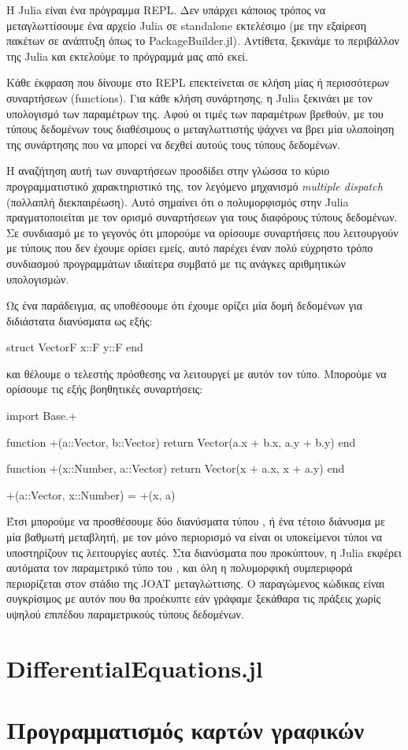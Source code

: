 Η Julia είναι ένα πρόγραμμα REPL.
Δεν υπάρχει κάποιος τρόπος να μεταγλωττίσουμε ένα αρχείο Julia σε standalone εκτελέσιμο (με την εξαίρεση πακέτων σε ανάπτυξη όπως το PackageBuilder.jl).
Αντίθετα, ξεκινάμε το περιβάλλον της Julia και εκτελούμε το πρόγραμμά μας από εκεί.

Κάθε έκφραση που δίνουμε στο REPL επεκτείνεται σε κλήση μίας ή περισσότερων συναρτήσεων (functions).
Για κάθε κλήση συνάρτησης, η Julia ξεκινάει με τον υπολογισμό των παραμέτρων της.
Αφού οι τιμές των παραμέτρων βρεθούν, με του τύπους δεδομένων τους διαθέσιμους ο μεταγλωττιστής ψάχνει να βρει μία υλοποίηση της συνάρτησης που να μπορεί να δεχθεί αυτούς τους τύπους δεδομένων.

Η αναζήτηση αυτή των συναρτήσεων προσδίδει στην γλώσσα το κύριο προγραμματιστικό χαρακτηριστικό της, τον λεγόμενο μηχανισμό \emph{multiple dispatch} (πολλαπλή διεκπαιρέωση).
Αυτό σημαίνει ότι ο πολυμορφισμός στην Julia πραγματοποιείται με τον ορισμό συναρτήσεων για τους διαφόρους τύπους δεδομένων.
Σε συνδιασμό με το γεγονός ότι μπορούμε να ορίσουμε συναρτήσεις που λειτουργούν με τύπους που δεν έχουμε ορίσει εμείς, αυτό παρέχει έναν πολύ εύχρηστο τρόπο συνδιασμού προγραμμάτων ιδιαίτερα συμβατό με τις ανάγκες αριθμητικών υπολογισμών.

Ως ένα παράδειγμα, ας υποθέσουμε ότι έχουμε ορίζει μία δομή δεδομένων για διδιάστατα διανύσματα ως εξής:

\begin{jllisting}[language=julia]
struct Vector{F}
    x::F
    y::F
end
\end{jllisting}

και θέλουμε ο τελεστής πρόσθεσης \jlinl{+} να λειτουργεί με αυτόν τον τύπο.
Μπορούμε να ορίσουμε τις εξής βοηθητικές συναρτήσεις:

\begin{jllisting}[language=julia]
import Base.+

function +(a::Vector, b::Vector)
    return Vector(a.x + b.x, a.y + b.y)
end

function +(x::Number, a::Vector)
    return Vector(x + a.x, x + a.y)
end

+(a::Vector, x::Number) = +(x, a)
\end{jllisting}

Έτσι μπορούμε να προσθέσουμε δύο διανύσματα τύπου , ή ένα τέτοιο διάνυσμα με μία βαθμωτή μεταβλητή, με τον μόνο περιορισμό να είναι οι υποκείμενοι τύποι να υποστηρίζουν τις λειτουργίες αυτές.
Στα διανύσματα που προκύπτουν, η Julia εκφέρει αυτόματα τον παραμετρικό τύπο  του , και όλη η πολυμορφική συμπεριφορά περιορίζεται στον στάδιο της JOAT μεταγλώττισης.
Ο παραγώμενος κώδικας είναι συγκρίσιμος με αυτόν που θα προέκυπτε εάν γράφαμε ξεκάθαρα τις πράξεις χωρίς υψηλού επιπέδου παραμετρικούς τύπους δεδομένων.

\section{DifferentialEquations.jl}


\section{Προγραμματισμός καρτών γραφικών}

